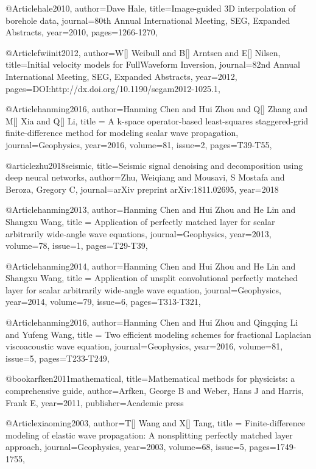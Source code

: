 @Article{hale2010,
  author={Dave Hale},
  title={Image-guided 3{D} interpolation of borehole data},
  journal={80th Annual International Meeting, SEG, Expanded Abstracts},
  year=2010,
  pages={1266-1270},
}

@Article{fwiinit2012,
  author={W[] Weibull and B[] Arntsen and E[] Nilsen},
  title={Initial velocity models for FullWaveform Inversion},
  journal={82nd Annual International Meeting, SEG, Expanded Abstracts},
  year=2012,
  pages={DOI:http://dx.doi.org/10.1190/segam2012-1025.1},
}






@Article{hanming2016,
  author={Hanming Chen and Hui Zhou and Q[] Zhang and M[] Xia and Q[] Li},
  title = {A k-space operator-based least-squares staggered-grid finite-difference method for modeling scalar wave propagation},
  journal={Geophysics},
  year=2016,
  volume=81,
  issue=2,
  pages={T39-T55},
}

@article{zhu2018seismic,
  title={Seismic signal denoising and decomposition using deep neural networks},
  author={Zhu, Weiqiang and Mousavi, S Mostafa and Beroza, Gregory C},
  journal={arXiv preprint arXiv:1811.02695},
  year={2018}
}



@Article{hanming2013,
  author={Hanming Chen and Hui Zhou and He Lin and Shangxu Wang},
  title = {Application of perfectly matched layer for scalar arbitrarily wide-angle wave equations},
  journal={Geophysics},
  year=2013,
  volume=78,
  issue=1,
  pages={T29-T39},
}

@Article{hanming2014,
  author={Hanming Chen and Hui Zhou and He Lin and Shangxu Wang},
  title = {Application of unsplit convolutional perfectly matched layer for scalar arbitrarily wide-angle wave equation},
  journal={Geophysics},
  year=2014,
  volume=79,
  issue=6,
  pages={T313-T321},
}

@Article{hanming2016,
  author={Hanming Chen and Hui Zhou and Qingqing Li and Yufeng Wang},
  title = {Two efficient modeling schemes for fractional Laplacian viscoacoustic wave equation},
  journal={Geophysics},
  year=2016,
  volume=81,
  issue=5,
  pages={T233-T249},
}

@book{arfken2011mathematical,
  title={Mathematical methods for physicists: a comprehensive guide},
  author={Arfken, George B and Weber, Hans J and Harris, Frank E},
  year={2011},
  publisher={Academic press}
}

@Article{xiaoming2003,
  author={T[] Wang and X[] Tang},
  title = {Finite-difference modeling of elastic wave propagation: A nonsplitting perfectly matched layer approach},
  journal={Geophysics},
  year=2003,
  volume=68,
  issue=5,
  pages={1749-1755},
}

